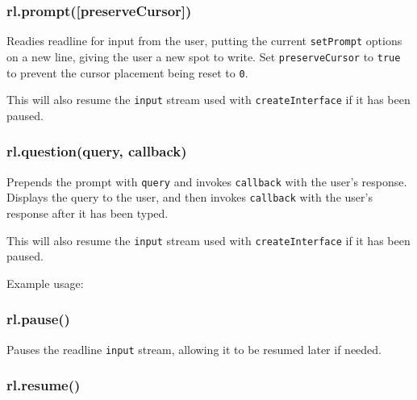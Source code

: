\subsubsection{rl.prompt({[}preserveCursor{]})}\label{rl.promptpreservecursor}

Readies readline for input from the user, putting the current
\texttt{setPrompt} options on a new line, giving the user a new spot to
write. Set \texttt{preserveCursor} to \texttt{true} to prevent the
cursor placement being reset to \texttt{0}.

This will also resume the \texttt{input} stream used with
\texttt{createInterface} if it has been paused.

\subsubsection{rl.question(query,
callback)}\label{rl.questionquery-callback}

Prepends the prompt with \texttt{query} and invokes \texttt{callback}
with the user's response. Displays the query to the user, and then
invokes \texttt{callback} with the user's response after it has been
typed.

This will also resume the \texttt{input} stream used with
\texttt{createInterface} if it has been paused.

Example usage:

\begin{Shaded}
\begin{Highlighting}[]
\NormalTok{(}\NormalTok{, }
  \NormalTok{(} 
\NormalTok{\});}
\end{Highlighting}
\end{Shaded}

\subsubsection{rl.pause()}\label{rl.pause}

Pauses the readline \texttt{input} stream, allowing it to be resumed
later if needed.

\subsubsection{rl.resume()}\label{rl.resume}

